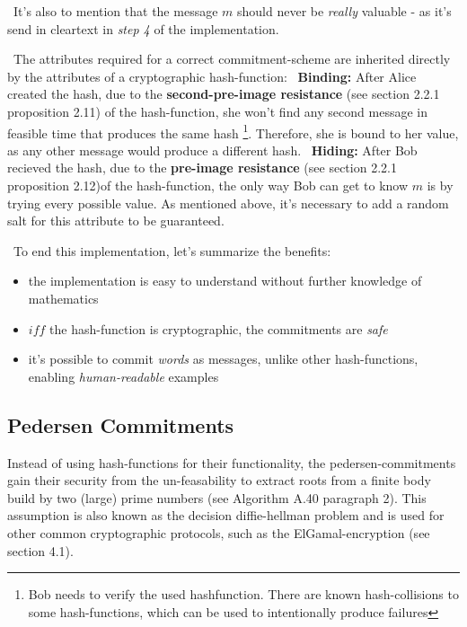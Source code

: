 ~\newline It's also to mention that the message $m$ should never be \textit{really} valuable - as it's send in cleartext in \textit{step 4} of the implementation.  

~\newline The attributes required for a correct commitment-scheme are inherited directly by the attributes of a cryptographic hash-function: 
~\newline \textbf{Binding:} After Alice created the hash, due to the \textbf{second-pre-image resistance} (see \cite{DeHa15} section 2.2.1 proposition 2.11) of the hash-function, she won't find any second message in feasible time that produces the same hash \footnote{Bob needs to verify the used hashfunction. There are known hash-collisions to some hash-functions, which can be used to intentionally produce failures}. Therefore, she is bound to her value, as any other message would produce a different hash.  
~\newline \textbf{Hiding:} After Bob recieved the hash, due to the \textbf{pre-image resistance} (see \cite{DeHa15} section 2.2.1 proposition 2.12)of the hash-function, the only way Bob can get to know $m$ is by trying every possible value. As mentioned above, it's necessary to add a random salt for this attribute to be guaranteed.

~\newline To end this implementation, let's summarize the benefits: 
\begin{itemize}
	\item the implementation is easy to understand without further knowledge of mathematics
	\item $iff$ the hash-function is cryptographic, the commitments are \textit{safe}
	\item it's possible to commit \textit{words} as messages, unlike other hash-functions, enabling \textit{human-readable} examples  
\end{itemize} 

\subsection{Pedersen Commitments}
Instead of using hash-functions for their functionality, the pedersen-commitments gain their security from the un-feasability to extract roots from a finite body build by two (large) prime numbers (see \cite{b2} Algorithm A.40 paragraph 2). This assumption is also known as the decision diffie-hellman problem and is used for other common cryptographic protocols, such as the ElGamal-encryption (see \cite{b1} section 4.1). 


